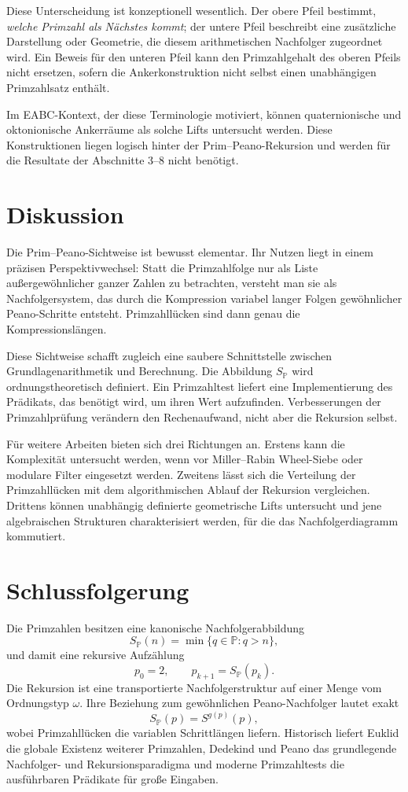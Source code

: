 \documentclass[11pt]{article}
\theoremstyle{definition}
\newcommand{\Pp}{\mathbb{P}}
\newcommand{\SP}{S_{\!\Pp}}
\newcommand{\gap}{g}
\begin{document}
Diese Unterscheidung ist konzeptionell wesentlich. Der obere Pfeil bestimmt, \emph{welche Primzahl als Nächstes kommt}; der untere Pfeil beschreibt eine zusätzliche Darstellung oder Geometrie, die diesem arithmetischen Nachfolger zugeordnet wird. Ein Beweis für den unteren Pfeil kann den Primzahlgehalt des oberen Pfeils nicht ersetzen, sofern die Ankerkonstruktion nicht selbst einen unabhängigen Primzahlsatz enthält.

Im EABC-Kontext, der diese Terminologie motiviert, können quaternionische und oktonionische Ankerräume als solche Lifts untersucht werden. Diese Konstruktionen liegen logisch hinter der Prim--Peano-Rekursion und werden für die Resultate der Abschnitte 3--8 nicht benötigt.

\section{Diskussion}

Die Prim--Peano-Sichtweise ist bewusst elementar. Ihr Nutzen liegt in einem präzisen Perspektivwechsel: Statt die Primzahlfolge nur als Liste außergewöhnlicher ganzer Zahlen zu betrachten, versteht man sie als Nachfolgersystem, das durch die Kompression variabel langer Folgen gewöhnlicher Peano-Schritte entsteht. Primzahllücken sind dann genau die Kompressionslängen.

Diese Sichtweise schafft zugleich eine saubere Schnittstelle zwischen Grundlagenarithmetik und Berechnung. Die Abbildung $\SP$ wird ordnungstheoretisch definiert. Ein Primzahltest liefert eine Implementierung des Prädikats, das benötigt wird, um ihren Wert aufzufinden. Verbesserungen der Primzahlprüfung verändern den Rechenaufwand, nicht aber die Rekursion selbst.

Für weitere Arbeiten bieten sich drei Richtungen an. Erstens kann die Komplexität untersucht werden, wenn vor Miller--Rabin Wheel-Siebe oder modulare Filter eingesetzt werden. Zweitens lässt sich die Verteilung der Primzahllücken mit dem algorithmischen Ablauf der Rekursion vergleichen. Drittens können unabhängig definierte geometrische Lifts untersucht und jene algebraischen Strukturen charakterisiert werden, für die das Nachfolgerdiagramm kommutiert.

\section{Schlussfolgerung}

Die Primzahlen besitzen eine kanonische Nachfolgerabbildung
\[
\SP(n)=\min\{q\in\Pp:q>n\},
\]
und damit eine rekursive Aufzählung
\[
p_0=2,\qquad p_{k+1}=\SP(p_k).
\]
Die Rekursion ist eine transportierte Nachfolgerstruktur auf einer Menge vom Ordnungstyp $\omega$. Ihre Beziehung zum gewöhnlichen Peano-Nachfolger lautet exakt
\[
\SP(p)=S^{\gap(p)}(p),
\]
wobei Primzahllücken die variablen Schrittlängen liefern. Historisch liefert Euklid die globale Existenz weiterer Primzahlen, Dedekind und Peano das grundlegende Nachfolger- und Rekursionsparadigma und moderne Primzahltests die ausführbaren Prädikate für große Eingaben.
\end{document}
